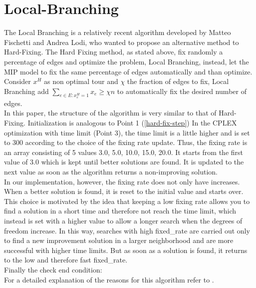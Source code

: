 \section{Local-Branching}
The Local Branching is a relatively recent algorithm developed by Matteo Fischetti and Andrea Lodi, who wanted to propose an alternative method to Hard-Fixing. The Hard Fixing method, as stated above, fix randomly a percentage of edges and optimize the problem, Local Branching, instead, let the MIP model to fix the same percentage of edges automatically and than optimize. \\
Consider $ x^H $ as non optimal tour and $ \chi $ the fraction of edges to fix, Local Branching add $ \sum_{ e\in E: x_e^H = 1 } x_e \ge \chi n $ to automatically fix the desired number of edges. \\ 
In this paper, the structure of the algorithm is very similar to that of Hard-Fixing. Initialization is analogous to Point 1 (\ref{hard-fix-step})
In the CPLEX optimization with time limit (Point 3), the time limit is a little higher and is set to 300 according to the choice of the fixing rate update. Thus, the fixing rate is an array consisting of 5 values {3.0, 5.0, 10.0, 15.0, 20.0}. It starts from the first value of 3.0 which is kept until better solutions are found. It is updated to the next value as soon as the algorithm returns a non-improving solution. \\
In our implementation, however, the fixing rate does not only have increases. When a better solution is found, it is reset to the initial value and starts over. \\
This choice is motivated by the idea that keeping a low fixing rate allows you to find a solution in a short time and therefore not reach the time limit, which instead is set with a higher value to allow a longer search when the degrees of freedom increase.
In this way, searches with high fixed\_rate are carried out only to find a new improvement solution in a larger neighborhood and are more successful with higher time limits. But as soon as a solution is found, it returns to the low and therefore fast fixed\_rate.\\
Finally the check end condition: \\
For a detailed explanation of the reasons for this algorithm refer to \cite{article}.

